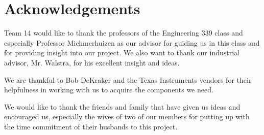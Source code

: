 \documentclass[ppfs.tex]{template/subfiles}
\begin{document}
\section{Acknowledgements}

Team 14 would like to thank the professors of the Engineering 339 class and especially Professor Michmerhuizen as our advisor for guiding us in this class and for providing insight into our project. We also want to thank our industrial advisor, Mr. Walstra, for his excellent insight and ideas.

We are thankful to Bob DeKraker and the Texas Instruments vendors for their helpfulness in working with us to acquire the components we need.

We would like to thank the friends and family that have given us ideas and encouraged us, especially the wives of two of our members for putting up with the time commitment of their husbands to this project.
\end{document}
